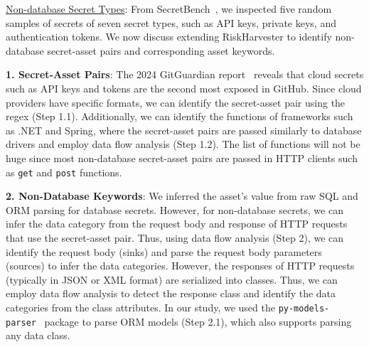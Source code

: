 \uline{Non-database Secret Types}: From SecretBench~\cite{secretbench}, we inspected five random samples of secrets of seven secret types, such as API keys, private keys, and authentication tokens. We now discuss extending RiskHarvester to identify non-database secret-asset pairs and corresponding asset keywords.

\textbf{1. Secret-Asset Pairs}: The 2024 GitGuardian report~\cite{gitguardian-secret-sprawl} reveals that cloud secrets such as API keys and tokens are the second most exposed in GitHub. Since cloud providers have specific formats, we can identify the secret-asset pair using the regex (Step 1.1). Additionally, we can identify the functions of frameworks such as .NET and Spring, where the secret-asset pairs are passed similarly to database drivers and employ data flow analysis (Step 1.2). The list of functions will not be huge since most non-database secret-asset pairs are passed in HTTP clients such as \texttt{get} and \texttt{post} functions. %

\textbf{2. Non-Database Keywords}: We inferred the asset's value from raw SQL and ORM parsing for database secrets. However, for non-database secrets, we can infer the data category from the request body and response of HTTP requests that use the secret-asset pair. Thus, using data flow analysis (Step 2), we can identify the request body (sinks) and parse the request body parameters (sources) to infer the data categories. However, the responses of HTTP requests (typically in JSON or XML format) are serialized into classes. Thus, we can employ data flow analysis to detect the response class and identify the data categories from the class attributes. In our study, we used the \texttt{py-models-parser}~\cite{py-models-parser} package to parse ORM models (Step 2.1), which also supports parsing any data class.



